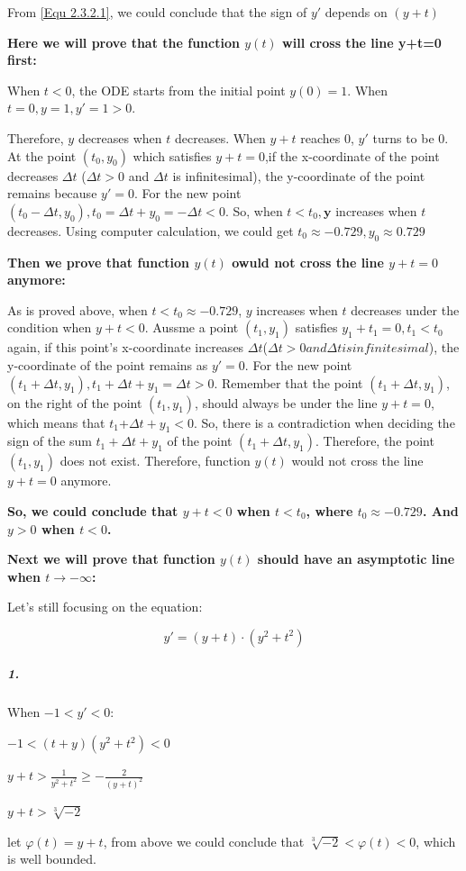 \documentclass[11pt,a4paper]{article}
\begin{document}
	From \ref{Equ 2.3.2.1}, we could conclude that the sign of $y'$ depends on $(y+t)$
	
	\textbf{Here we will prove that the function $y(t)$ will cross the line y+t=0 first:}
	
	When $t<0$, the ODE starts from the initial point $y(0)=1$. When $t=0, y=1, y'=1>0$.
	
	Therefore, $y$ decreases when $t$ decreases. When $y+t$ reaches 0, $y'$ turns to be 0. At the point $(t_0, y_0)$ which satisfies $y+t=0$,if the x-coordinate of the point decreases $\Delta t$ ($\Delta t>0$ and $\Delta t$ is infinitesimal), the y-coordinate of the point remains because $y' = 0$. For the new point $(t_0- \Delta t, y_0), t_0=\Delta t +y_0=-\Delta t <0$. So, when $t<t_0, \textbf{y}$ increases when $t$ decreases. Using computer calculation, we could get $t_0\approx -0.729, y_0 \approx 0.729$ 

	\textbf{Then we prove that function $y(t)$ owuld not cross the line $y+t=0$ anymore:}

	As is proved above, when $t<t_0\approx -0.729$, $y$ increases when $t$ decreases under the condition when $y+t<0$. Aussme a point $(t_1,y_1)$ satisfies $y_1+t_1=0, t_1<t_0$ again, if this point's x-coordinate increases $\Delta t$($\Delta t > 0 and \Delta t is infinitesimal$), the y-coordinate of the point remains as $y'=0$. For the new point $(t_1+\Delta t, y_1), t_1+\Delta t+y_1=\Delta t>0$. Remember that the point $(t_1 + \Delta t, y_1)$, on the right of the point $(t_1,y_1)$, should always be under the line $y+t=0$, which means that $t_1$+$\Delta t + y_1 < 0$. So, there is a contradiction when deciding the sign of the sum $t_1+\Delta t+y_1$ of the point $(t_1+\Delta t, y_1)$. Therefore, the point $(t_1, y_1)$ does not exist. Therefore, function $y(t)$ would not cross the line $y+t=0$ anymore.
	
	\textbf{So, we could conclude that $y+t<0$ when $t<t_0$, where $t_0 \approx -0.729$. And $y>0$ when $t<0$.}
	
	\textbf{Next we will prove that function $y(t)$ should have an asymptotic line when $t \rightarrow -\infty$:}
	
	Let's still focusing on the equation:
	
	\begin{equation}
		y'=(y+t)\cdot(y^2+t^2) \label{Equ 2.3.2.1}
	\end{equation}
	
	\subparagraph{1.} When $-1<y'<0:$
	
	\begin{center}
		$-1<(t+y)(y^2+t^2)<0$
		
		$y+t>\frac{1}{y^2+t^2}\geq -\frac{2}{(y+t)^2}$
		
		$y+t>\sqrt[3]{-2}$
		
	\end{center}
	let $\varphi(t)=y+t$, from above we could conclude that $\sqrt[3]{-2} < \varphi(t)<0$, which is well bounded.
	
\end{document}
